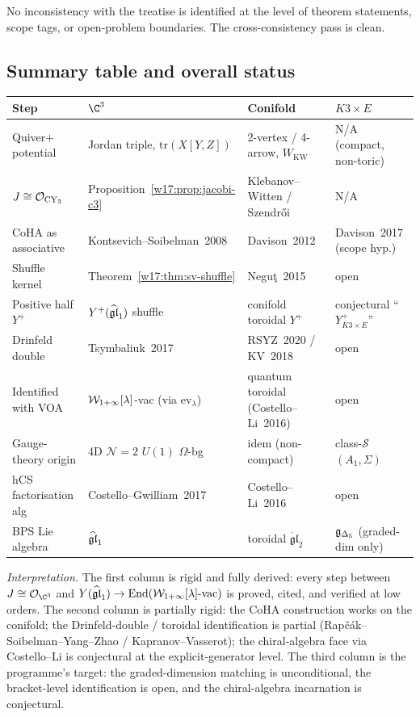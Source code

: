 No inconsistency with the treatise is identified at the level of theorem
statements, scope tags, or open-problem boundaries. The cross-consistency
pass is clean.

\subsection{Summary table and overall status}
\label{w17:subsec:summary-table}

\begin{center}
\begin{tabular}{l|l|l|l}
\textbf{Step} & \textbf{$\C^3$} & \textbf{Conifold} & \textbf{$K3 \times E$} \\\hline
Quiver$+$potential & Jordan triple, $\mathrm{tr}(X[Y, Z])$
& 2-vertex / 4-arrow, $W_{\mathrm{KW}}$ & N/A (compact, non-toric) \\
$J \cong \mathcal{O}_{\mathrm{CY}_3}$ & Proposition~\ref{w17:prop:jacobi-c3}
& Klebanov--Witten / Szendr\H{o}i
& N/A \\
CoHA as associative & Kontsevich--Soibelman~2008
& Davison~2012 & Davison~2017 (scope hyp.) \\
Shuffle kernel & Theorem~\ref{w17:thm:sv-shuffle}
& Negu\c t~2015 & open \\
Positive half $Y^+$ & $Y^+(\widehat{\mathfrak{gl}}_1)$ shuffle
& conifold toroidal $Y^+$ & conjectural ``$Y^+_{K3 \times E}$'' \\
Drinfeld double & Tsymbaliuk~2017 & RSYZ~2020 / KV~2018 & open \\
Identified with VOA & $\mathcal{W}_{1+\infty}[\lambda]$-vac (via $\mathrm{ev}_\lambda$)
& quantum toroidal (Costello--Li~2016) & open \\
Gauge-theory origin & 4D $\mathcal{N} = 2$ $U(1)$ $\Omega$-bg
& idem (non-compact) & class-$\mathcal{S}$ $(A_1, \Sigma)$ \\
hCS factorisation alg & Costello--Gwilliam~2017 & Costello--Li~2016 & open \\
BPS Lie algebra & $\widehat{\mathfrak{gl}}_1$ & toroidal $\ddot{\mathfrak{gl}}_2$
& $\mathfrak{g}_{\Delta_5}$ (graded-dim only) \\
\end{tabular}
\end{center}

\emph{Interpretation.} The first column is rigid and fully derived: every step
between $\Jac \cong \mathcal{O}_{\C^3}$ and $Y(\widehat{\mathfrak{gl}}_1) \to \mathrm{End}
(\mathcal{W}_{1+\infty}[\lambda]\text{-vac})$ is proved, cited, and verified at low orders.
The second column is partially rigid: the CoHA construction works on the
conifold; the Drinfeld-double / toroidal identification is partial
(Rap\v c\'ak--Soibelman--Yang--Zhao / Kapranov--Vasserot); the chiral-algebra
face via Costello--Li is conjectural at the explicit-generator level. The
third column is the programme's target: the graded-dimension matching is
unconditional, the bracket-level identification is open, and the
chiral-algebra incarnation is conjectural.

